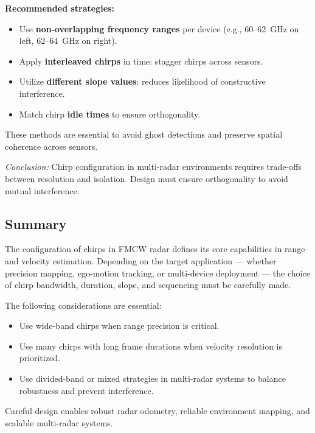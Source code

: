 \textbf{Recommended strategies:}
\begin{itemize}
    \item Use \textbf{non-overlapping frequency ranges} per device (e.g., 60–62~GHz on left, 62–64~GHz on right).
    \item Apply \textbf{interleaved chirps} in time: stagger chirps across sensors.
    \item Utilize \textbf{different slope values}: reduces likelihood of constructive interference.
    \item Match chirp \textbf{idle times} to ensure orthogonality.
\end{itemize}

These methods are essential to avoid ghost detections and preserve spatial coherence across sensors.

\vspace{1em}

{\small
\textit{Conclusion:} Chirp configuration in multi-radar environments requires trade-offs between resolution and isolation.  
Design must ensure orthogonality to avoid mutual interference.
}

\vspace{1em}

\subsection{Summary}

The configuration of chirps in FMCW radar defines its core capabilities in range and velocity estimation.
Depending on the target application — whether precision mapping, ego-motion tracking, or multi-device deployment — the choice of chirp bandwidth, duration, slope, and sequencing must be carefully made.

The following considerations are essential:
\begin{itemize}
    \item Use wide-band chirps when range precision is critical.
    \item Use many chirps with long frame durations when velocity resolution is prioritized.
    \item Use divided-band or mixed strategies in multi-radar systems to balance robustness and prevent interference.
\end{itemize}

Careful design enables robust radar odometry, reliable environment mapping, and scalable multi-radar systems.
